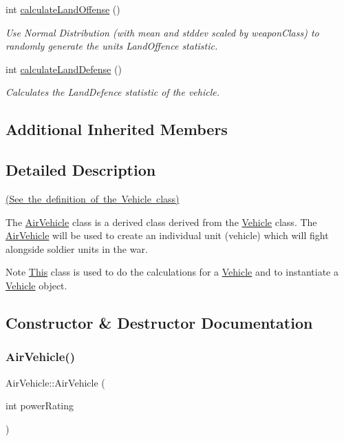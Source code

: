 \begin{DoxyCompactItemize}
int \mbox{\hyperlink{class_air_vehicle_afbbfd8dd22d786ca679669f2ae5f9f41}{calculate\+Land\+Offense}} ()
\begin{DoxyCompactList}\small\item\em Use Normal Distribution (with mean and stddev scaled by weapon\+Class) to randomly generate the unit\textquotesingle{}s Land\+Offence statistic. \end{DoxyCompactList}\item 
int \mbox{\hyperlink{class_air_vehicle_acb7d32241e484f1ece2123451f061168}{calculate\+Land\+Defense}} ()
\begin{DoxyCompactList}\small\item\em Calculates the Land\+Defence statistic of the vehicle. \end{DoxyCompactList}\end{DoxyCompactItemize}
\subsection*{Additional Inherited Members}


\subsection{Detailed Description}
\mbox{\hyperlink{_vehicle_8h_source}{(See the definition of the Vehicle class)}}

The \mbox{\hyperlink{class_air_vehicle}{Air\+Vehicle}} class is a derived class derived from the \mbox{\hyperlink{class_vehicle}{Vehicle}} class. The \mbox{\hyperlink{class_air_vehicle}{Air\+Vehicle}} will be used to create an individual unit (vehicle) which will fight alongside soldier units in the war. \begin{DoxyNote}{Note}
\mbox{\hyperlink{class_this}{This}} class is used to do the calculations for a \mbox{\hyperlink{class_vehicle}{Vehicle}} and to instantiate a \mbox{\hyperlink{class_vehicle}{Vehicle}} object. 
\end{DoxyNote}


\subsection{Constructor \& Destructor Documentation}
\mbox{\label{class_air_vehicle_a69b975622277ab88d8f034a213a55d64}} 
\subsubsection{\texorpdfstring{AirVehicle()}{AirVehicle()}}
{\footnotesize\ttfamily Air\+Vehicle\+::\+Air\+Vehicle (\begin{DoxyParamCaption}\item[{int}]{power\+Rating }\end{DoxyParamCaption})}



